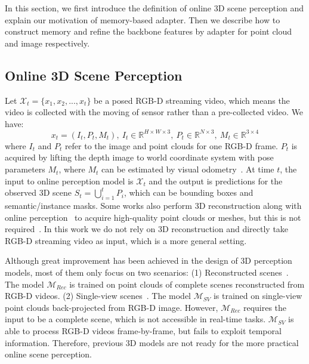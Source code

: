 
In this section, we first introduce the definition of online 3D scene perception and explain our motivation of memory-based adapter. Then we describe how to construct memory and refine the backbone features by adapter for point cloud and image respectively.

\subsection{Online 3D Scene Perception}\label{def}
Let $\mathcal{X}_t=\{x_1,x_2,...,x_t\}$ be a posed RGB-D streaming video, which means the video is collected with the moving of sensor rather than a pre-collected video. We have:
\begin{equation}
    x_t=(I_t,P_t,M_t),\ I_t\in \mathbb{R}^{H\times W\times 3},\ P_t\in \mathbb{R}^{N\times 3},\ M_t\in \mathbb{R}^{3\times 4}
\end{equation}
where $I_t$ and $P_t$ refer to the image and point clouds for one RGB-D frame. $P_t$ is acquired by lifting the depth image to world coordinate system with pose parameters $M_t$, where $M_t$ can be estimated by visual odometry~\cite{park2017colored,zhao2021surprising}.
At time $t$, the input to online perception model is $\mathcal{X}_t$ and the output is predictions for the observed 3D scene $S_t=\bigcup_{i=1}^t{P_i}$, which can be bounding boxes and semantic/instance masks. Some works also perform 3D reconstruction along with online perception~\cite{liu2022ins} to acquire high-quality point clouds or meshes, but this is not required~\cite{chaplot2020object,ramakrishnan2022poni,zhang20233d}. In this work we do not rely on 3D reconstruction and directly take RGB-D streaming video as input, which is a more general setting.

Although great improvement has been achieved in the design of 3D perception models, most of them only focus on two scenarios: (1) Reconstructed scenes~\cite{armeni20163d,dai2017scannet}. The model $\mathcal{M}_{Rec}$ is trained on point clouds of complete scenes reconstructed from RGB-D videos. (2) Single-view scenes~\cite{Silberman2012nyu,song2015sun}. The model $\mathcal{M}_{SV}$ is trained on single-view point clouds back-projected from RGB-D image. However, $\mathcal{M}_{Rec}$ requires the input to be a complete scene, which is not accessible in real-time tasks. $\mathcal{M}_{SV}$ is able to process RGB-D videos frame-by-frame, but fails to exploit temporal information. 
Therefore, previous 3D models are not ready for the more practical online scene perception.

